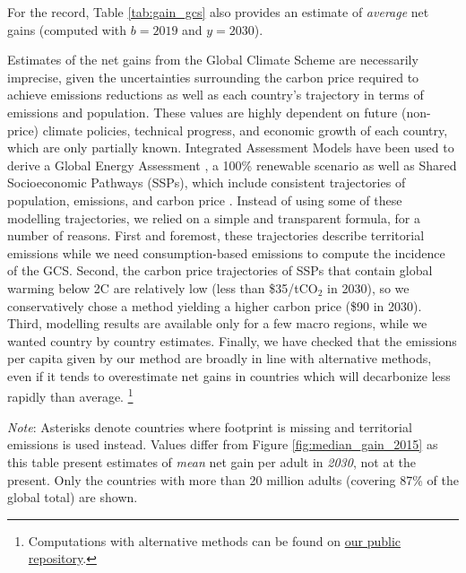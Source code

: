 For the record, Table \ref{tab:gain_gcs} also provides an estimate of \textit{average} net gains (computed with $b = 2019$ and $y = 2030$). %

Estimates of the net gains from the Global Climate Scheme are necessarily imprecise, given the uncertainties surrounding the carbon price required to achieve emissions reductions as well as each country's trajectory in terms of emissions and population. These values are highly dependent on future (non-price) climate policies, technical progress, and economic growth of each country, which are only partially known. Integrated Assessment Models have been used to derive a Global Energy Assessment \citep{johansson_global_2012}, a 100\% renewable scenario \citep{greenpeace_energy_2015} as well as Shared Socioeconomic Pathways (SSPs), which include consistent trajectories of population, emissions, and carbon price \citep{riahi_shared_2017,bauer_shared_2017,van_vuuren_energy_2017,fricko_marker_2017}. Instead of using some of these modelling trajectories, we relied on a simple and transparent formula, for a number of reasons. First and foremost, these trajectories describe territorial emissions while we need consumption-based emissions to compute the incidence of the GCS. Second, the carbon price trajectories of SSPs that contain global warming below 2\textdegree{}C are relatively low (less than \$35/tCO$_\text{2}$ in 2030), so we conservatively chose a method yielding a higher carbon price (\$90 in 2030). Third, modelling results are available only for a few macro regions, while we wanted country by country estimates. Finally, we have checked that the emissions per capita given by our method are broadly in line with alternative methods, even if it tends to overestimate net gains in countries which will decarbonize less rapidly than average.%
\footnote{Computations with alternative methods can be found on \href{https://github.com/bixiou/global_tax_attitudes/blob/main/code_global/map_GCS_incidence.R}{our public repository}.} 

    {\footnotesize \textit{Note}: %
    Asterisks denote countries where footprint is missing and territorial emissions is used instead. %
    Values differ from Figure \ref{fig:median_gain_2015} as this table present estimates of \textit{mean} net gain per adult in \textit{2030}, not at the present. Only the countries with more than 20 million adults (covering 87\% of the global total) are shown. 
    }

